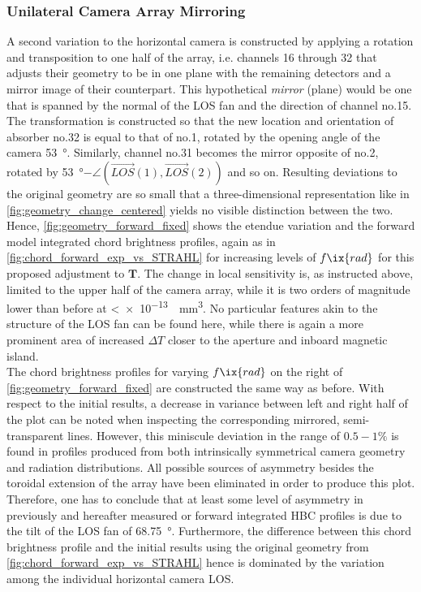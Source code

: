         \subsubsection*{Unilateral Camera Array Mirroring}%
%
            A second variation to the horizontal camera is constructed by applying a rotation and transposition to one half of the array, i.e. channels 16 through 32 that adjusts their geometry to be in one plane with the remaining detectors and a mirror image of their counterpart. This hypothetical \textit{mirror} (plane) would be one that is spanned by the normal of the LOS fan and the direction of channel no.15. The transformation is constructed so that the new location and orientation of absorber no.32 is equal to that of no.1, rotated by the opening angle of the camera \SI{53}{\degree}. Similarly, channel no.31 becomes the mirror opposite of no.2, rotated by \SI{53}{\degree}$-\angle\left(\vec{LOS}(1), \vec{LOS}(2)\right)$ and so on. Resulting deviations to the original geometry are so small that a three-dimensional representation like in \cref{fig:geometry_change_centered} yields no visible distinction between the two. Hence, \cref{fig:geometry_forward_fixed} shows the etendue variation and the forward model integrated chord brightness profiles, again as in \cref{fig:chord_forward_exp_vs_STRAHL} for increasing levels of $f\ix{rad}$ for this proposed adjustment to $\mathbf{T}$. The change in local sensitivity is, as instructed above, limited to the upper half of the camera array, while it is two orders of magnitude lower than before at <\SI[per-mode=reciprocal]{e-13}{\per\cubic\milli\meter}. No particular features akin to the structure of the LOS fan can be found here, while there is again a more prominent area of increased $\Delta T$ closer to the aperture and inboard magnetic island.\\%
            The chord brightness profiles for varying $f\ix{rad}$ on the right of \cref{fig:geometry_forward_fixed} are constructed the same way as before. With respect to the initial results, a decrease in variance between left and right half of the plot can be noted when inspecting the corresponding mirrored, semi-transparent lines. However, this miniscule deviation in the range of $0.5-1\%$ is found in profiles produced from both intrinsically symmetrical camera geometry and radiation distributions. All possible sources of asymmetry besides the toroidal extension of the array have been eliminated in order to produce this plot. Therefore, one has to conclude that at least some level of asymmetry in previously and hereafter measured or forward integrated HBC profiles is due to the tilt of the LOS fan of \SI{68.75}{\degree}. Furthermore, the difference between this chord brightness profile and the initial results using the original geometry from \cref{fig:chord_forward_exp_vs_STRAHL} hence is dominated by the variation among the individual horizontal camera LOS.\\%
